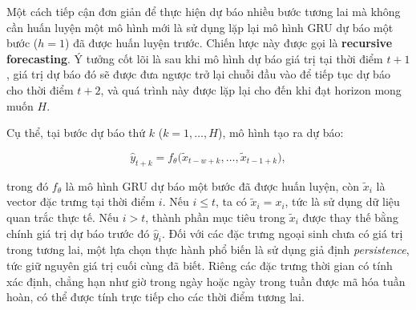 \documentclass[12pt,oneside]{report}
\begin{document}
Một cách tiếp cận đơn giản để thực hiện dự báo nhiều bước tương lai mà không cần huấn luyện một mô hình mới là sử dụng lặp lại mô hình GRU dự báo một bước ($h=1$) đã được huấn luyện trước. Chiến lược này được gọi là \textbf{recursive forecasting}. Ý tưởng cốt lõi là sau khi mô hình dự báo giá trị tại thời điểm $t+1$, giá trị dự báo đó sẽ được đưa ngược trở lại chuỗi đầu vào để tiếp tục dự báo cho thời điểm $t+2$, và quá trình này được lặp lại cho đến khi đạt horizon mong muốn $H$.

Cụ thể, tại bước dự báo thứ $k$ ($k=1,\dots,H$), mô hình tạo ra dự báo:

\begin{equation}
\hat{y}_{t+k} = f_{\theta}\big(\tilde{x}_{t-w+k}, \dots, \tilde{x}_{t-1+k}\big),
\end{equation}

trong đó $f_{\theta}$ là mô hình GRU dự báo một bước đã được huấn luyện, còn $\tilde{x}_i$ là vector đặc trưng tại thời điểm $i$. Nếu $i \leq t$, ta có $\tilde{x}_i = x_i$, tức là sử dụng dữ liệu quan trắc thực tế. Nếu $i > t$, thành phần mục tiêu trong $\tilde{x}_i$ được thay thế bằng chính giá trị dự báo trước đó $\hat{y}_i$. Đối với các đặc trưng ngoại sinh chưa có giá trị trong tương lai, một lựa chọn thực hành phổ biến là sử dụng giả định \textit{persistence}, tức giữ nguyên giá trị cuối cùng đã biết. Riêng các đặc trưng thời gian có tính xác định, chẳng hạn như giờ trong ngày hoặc ngày trong tuần được mã hóa tuần hoàn, có thể được tính trực tiếp cho các thời điểm tương lai.
\end{document}

